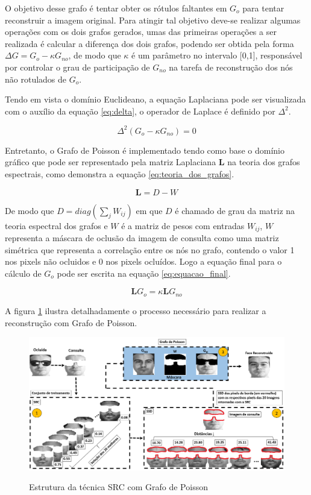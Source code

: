 O objetivo desse grafo é tentar obter os rótulos faltantes em $G_o$ para tentar reconstruir a imagem original. Para atingir tal objetivo deve-se realizar algumas operações com os dois grafos gerados, umas das primeiras operações a ser realizada é calcular a diferença dos dois grafos, podendo ser obtida pela forma $\Delta G = G_o - \kappa G_{no}$, de modo que $\kappa$ é um parâmetro no intervalo [0,1],  responsável por controlar o grau de participação de $G_{no}$ na tarefa de reconstrução dos nós não rotulados de $G_o$. 

Tendo em vista o domínio Euclideano, a equação Laplaciana pode ser visualizada com o auxílio da equação \ref{eq:delta}, o operador de Laplace é definido por $\Delta^2$.

\begin{equation}
\Delta^2(G_o - \kappa G_{no}) = 0
\label{eq:delta}
\end{equation}

Entretanto, o Grafo de Poisson é implementado tendo como base o domínio gráfico que pode ser representado pela matriz Laplaciana $\textbf{L}$ na teoria dos grafos espectrais, como demonstra a equação \ref{eq:teoria_dos_grafos}. 

\begin{equation}
\textbf{L} = D - W
\label{eq:teoria_dos_grafos}
\end{equation}

De modo que $D= diag(\sum_j W_{ij})$ em que $D$ é chamado de grau da matriz na teoria espectral dos grafos e $W$ é a matriz de pesos com entradas $W_{ij}$, $W$ representa a máscara de oclusão da imagem de consulta como uma matriz simétrica que representa a correlação entre os nós no grafo, contendo o valor 1 nos pixels não ocluidos e 0 nos pixels ocluídos. Logo a equação final para o cálculo de $G_o$ pode ser escrita  na equação \ref{eq:equacao_final}.

\begin{equation}
\textbf{L} G_o =  \kappa \textbf{L} G_{no}
\label{eq:equacao_final}
\end{equation}

 A figura \ref{fig:estrutura_src_gp} ilustra detalhadamente o processo necessário para realizar a reconstrução com Grafo de Poisson.

\begin{figure}[H]
\centering
\caption{Estrutura da técnica SRC com Grafo de Poisson}
\includegraphics[scale = 0.40]{imgs4/estrutura/estrutura_src_gp}
\label{fig:estrutura_src_gp}
\end{figure}

